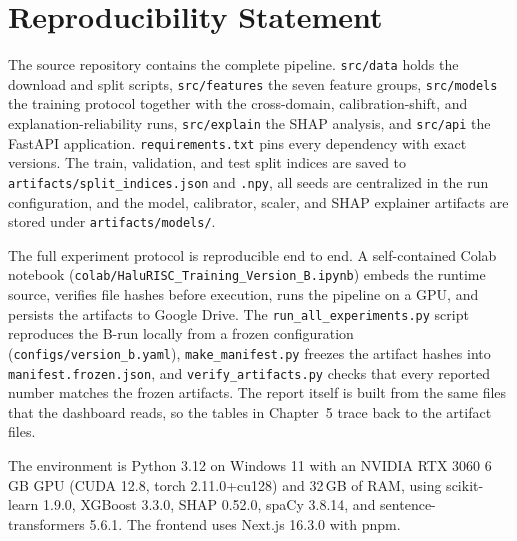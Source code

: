 \section{Reproducibility Statement}

The source repository contains the complete pipeline. \texttt{src/data} holds the download and split scripts, \texttt{src/features} the seven feature groups, \texttt{src/models} the training protocol together with the cross-domain, calibration-shift, and explanation-reliability runs, \texttt{src/explain} the SHAP analysis, and \texttt{src/api} the FastAPI application. \texttt{requirements.txt} pins every dependency with exact versions. The train, validation, and test split indices are saved to \texttt{artifacts/split\_indices.json} and \texttt{.npy}, all seeds are centralized in the run configuration, and the model, calibrator, scaler, and SHAP explainer artifacts are stored under \texttt{artifacts/models/}.

The full experiment protocol is reproducible end to end. A self-contained Colab notebook (\texttt{colab/HaluRISC\_Training\_Version\_B.ipynb}) embeds the runtime source, verifies file hashes before execution, runs the pipeline on a GPU, and persists the artifacts to Google Drive. The \texttt{run\_all\_experiments.py} script reproduces the B-run locally from a frozen configuration (\texttt{configs/version\_b.yaml}), \texttt{make\_manifest.py} freezes the artifact hashes into \texttt{manifest.frozen.json}, and \texttt{verify\_artifacts.py} checks that every reported number matches the frozen artifacts. The report itself is built from the same files that the dashboard reads, so the tables in Chapter~5 trace back to the artifact files.

The environment is Python 3.12 on Windows 11 with an NVIDIA RTX 3060 6\,GB GPU (CUDA 12.8, torch 2.11.0+cu128) and 32\,GB of RAM, using scikit-learn 1.9.0, XGBoost 3.3.0, SHAP 0.52.0, spaCy 3.8.14, and sentence-transformers 5.6.1. The frontend uses Next.js 16.3.0 with pnpm.

